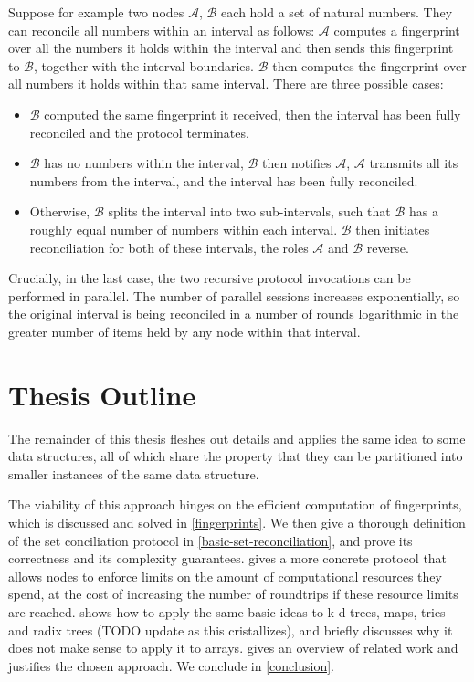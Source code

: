 Suppose for example two nodes $\mathcal{A}$, $\mathcal{B}$ each hold a set of natural numbers.
They can reconcile all numbers within an interval as follows: $\mathcal{A}$ computes
a fingerprint over all the numbers it holds within the interval and then sends this
fingerprint to $\mathcal{B}$, together with the interval boundaries. $\mathcal{B}$ then computes
the fingerprint over all numbers it holds within that same interval. There
are three possible cases:

\begin{itemize}
\item
  $\mathcal{B}$ computed the same fingerprint it received, then the interval has
  been fully reconciled and the protocol terminates.
\item
  $\mathcal{B}$ has no numbers within the interval, $\mathcal{B}$ then notifies $\mathcal{A}$, $\mathcal{A}$
  transmits all its numbers from the interval, and the interval has been
  fully reconciled.
\item
  Otherwise, $\mathcal{B}$ splits the interval into two sub-intervals, such that $\mathcal{B}$
  has a roughly equal number of numbers within each interval. $\mathcal{B}$ then
  initiates reconciliation for both of these intervals, the roles $\mathcal{A}$ and
  $\mathcal{B}$ reverse.
\end{itemize}

Crucially, in the last case, the two recursive protocol invocations can
be performed in parallel. The number of parallel sessions increases
exponentially, so the original interval is being reconciled in a number
of rounds logarithmic in the greater number of items held by any node
within that interval.

\section{Thesis Outline}

The remainder of this thesis fleshes out details and applies the same
idea to some data structures, all of which share the property that they can be partitioned into smaller instances of the same data structure.

The viability of this approach
hinges on the efficient computation of fingerprints, which is discussed
and solved in \cref{fingerprints}. We then give a thorough definition of the set
conciliation protocol in \cref{basic-set-reconciliation}, and prove its correctness and its
complexity guarantees.  gives a more concrete protocol that
allows nodes to enforce limits on the amount of computational resources
they spend, at the cost of increasing the number of roundtrips if these
resource limits are reached.  shows how to apply the same basic
ideas to k-d-trees, maps, tries and radix trees (TODO update as this cristallizes), and briefly discusses
why it does not make sense to apply it to arrays. 
gives an overview of related work and justifies the chosen approach. We
conclude in \cref{conclusion}.